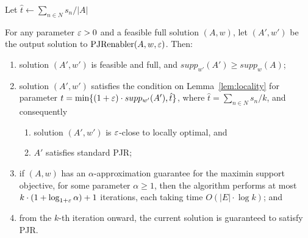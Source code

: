 \begin{algorithm}[htb]\label{alg:localpjr}
\SetAlgoLined
{}

Let $\hat{t}\leftarrow \sum_{n\in N} s_n / |A|$\;
\caption{$\LSPJR(A,w,\eps)$}
\end{algorithm}

\begin{theorem}\label{thm:enabler}
For any parameter $\varepsilon>0$ and a feasible full solution $(A,w)$, let $(A',w')$ be the output solution to $\LSPJR(A,w,\eps)$. Then: 
\begin{enumerate}
    \item solution $(A',w')$ is feasible and full, and $supp_{w'}(A')\geq supp_w(A)$; \label{item:support}
    \item solution $(A', w')$ satisfies the condition on Lemma~\ref{lem:locality} for parameter $t=\min\{(1+\varepsilon)\cdot supp_{w'}(A'), \hat{t}\}$, where $\hat{t}=\sum_{n\in N} s_n / k$, and consequently \label{item:tPJR}
    \begin{enumerate}
        \item solution $(A',w')$ is $\varepsilon$-close to locally optimal, and
        \item $A'$ satisfies standard PJR; \label{item:PJR}
    \end{enumerate}
    \item if $(A,w)$ has an $\alpha$-approximation guarantee for the maximin support objective, for some parameter $\alpha\geq 1$, then the algorithm performs at most $k\cdot (1+\log_{1+\varepsilon} \alpha)+1$ iterations, each taking time $O(|E|\cdot \log k)$; and \label{item:iterations}
    \item from the $k$-th iteration onward, the current solution is guaranteed to satisfy PJR. \label{item:infinity}
\end{enumerate}
\end{theorem}

